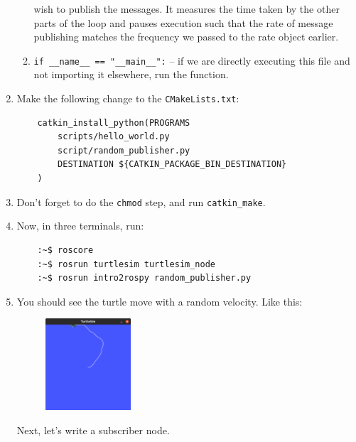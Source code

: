 \documentclass{article}
\begin{document}
\begin{enumerate}
\begin{enumerate}
            wish to publish the messages. It measures the time taken by the other parts of the 
            loop and pauses execution such that the rate of message publishing matches the 
            frequency we passed to the rate object earlier.
            \item \texttt{if __name__ == "__main__":} -- if we are directly executing
            this file and not importing it elsewhere, run the function.
        \end{enumerate}
        \item Make the following change to the \texttt{CMakeLists.txt}:
        \begin{verbatim}
    catkin_install_python(PROGRAMS
        scripts/hello_world.py
        script/random_publisher.py
        DESTINATION ${CATKIN_PACKAGE_BIN_DESTINATION}
    )
        \end{verbatim}
        \item Don't forget to do the \texttt{chmod} step, and run \texttt{catkin\_make}.
        \item Now, in three terminals, run:
        \begin{verbatim}
    :~$ roscore
    :~$ rosrun turtlesim turtlesim_node 
    :~$ rosrun intro2rospy random_publisher.py
        \end{verbatim}
        \item You should see the turtle move with a random velocity. Like this:
        \begin{figure}[H]
            \center
            \includegraphics[width = 0.3\textwidth]{turtle.png}
        \end{figure}
        Next, let's write a subscriber node.
    \end{enumerate}
    \newpage
\end{document}

